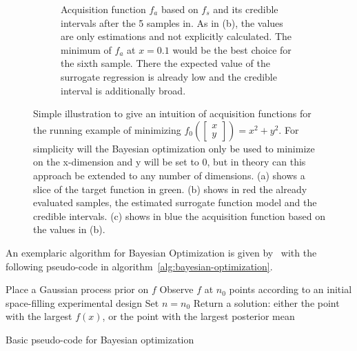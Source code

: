 \begin{figure}[ht!]
\begin{subfigure}{\textwidth}
        \caption[.]{
            Acquisition function $f_a$ based on $f_s$ and its credible intervals after the 5 samples in.
            As in (b), the values are only estimations and not explicitly calculated.
            The minimum of $f_a$ at $x=0.1$ would be the best choice for the sixth sample.
            There the expected value of the surrogate regression is already low and the credible interval is additionally broad.
        }
    \end{subfigure}
    \caption[.]{
        Simple illustration to give an intuition of acquisition functions for the running example of minimizing $f_0 \left( \begin{bmatrix}x\\y \end{bmatrix} \right) = x^2 + y^2$.
        For simplicity will the Bayesian optimization only be used to minimize on the x-dimension and y will be set to 0, but in theory can this approach be extended to any number of dimensions.
        (a) shows a slice of the target function in green.
        (b) shows in red the already evaluated samples, the estimated surrogate function model and the credible intervals.
        (c) shows in blue the acquisition function based on the values in (b).
    }
    \label{fig:theory:acquisition-function}
\end{figure}
An exemplaric algorithm for Bayesian Optimization is given by~\textcite{Frazier-Bayesian-Optimization} with the following pseudo-code in algorithm~\ref{alg:bayesian-optimization}.
\begin{algorithm}[ht!]
    \SetAlgoLined
    Place a Gaussian process prior on $f$\;
    Observe $f$ at $n_0$ points according to an initial space-filling experimental design\;
    Set $n=n_0$\;
    Return a solution: either the point with the largest $f(x)$, or the point with the largest posterior mean\;
    \caption{Basic pseudo-code for Bayesian optimization}
    \label{alg:bayesian-optimization}
\end{algorithm}
